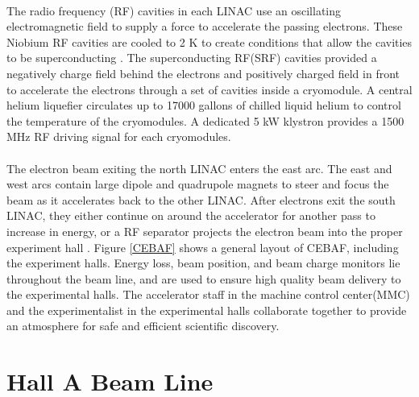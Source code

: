 	\paragraph{}The radio frequency (RF) cavities in each LINAC use an oscillating electromagnetic field to supply a force to accelerate the passing electrons. These Niobium RF cavities are cooled to 2 K to create conditions that allow the cavities to be superconducting \cite{HallA}. The superconducting RF(SRF) cavities provided a negatively charge field behind the electrons and positively charged field in front to accelerate the electrons through a set of cavities inside a cryomodule. A central helium liquefier circulates up to 17000 gallons of chilled liquid helium to control the temperature of the cryomodules. A dedicated 5 kW klystron  provides a 1500 MHz RF driving signal for each cryomodules. 
	\paragraph{} The electron beam exiting the north LINAC enters the east arc. The east and west arcs contain large dipole and quadrupole magnets to steer and focus the beam as it accelerates back to the other LINAC. After electrons exit the south LINAC, they either continue on around the accelerator for another pass to increase in energy, or a RF separator projects the electron beam into the proper experiment hall \cite{CEBAF}. Figure \ref{CEBAF} shows a general layout of CEBAF, including the experiment halls. Energy loss, beam position, and beam charge monitors lie throughout the beam line, and are used to ensure high quality beam delivery to the experimental halls. The accelerator staff in the machine control center(MMC) and the experimentalist in the experimental halls collaborate together to provide an atmosphere for safe and efficient scientific discovery.

 \section{Hall A Beam Line}\label{sec:halla}
	 
	 

